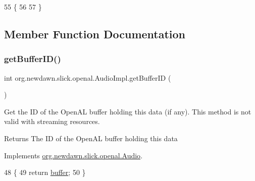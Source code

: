 \begin{DoxyCode}
55                           \{
56         
57     \}
\end{DoxyCode}


\subsection{Member Function Documentation}
\mbox{\label{classorg_1_1newdawn_1_1slick_1_1openal_1_1_audio_impl_aaf5df57bc6269d59c5220fc89ef3800f}} 
\subsubsection{\texorpdfstring{get\+Buffer\+I\+D()}{getBufferID()}}
{\footnotesize\ttfamily int org.\+newdawn.\+slick.\+openal.\+Audio\+Impl.\+get\+Buffer\+ID (\begin{DoxyParamCaption}{ }\end{DoxyParamCaption})\hspace{0.3cm}{\ttfamily [inline]}}

Get the ID of the Open\+AL buffer holding this data (if any). This method is not valid with streaming resources.

\begin{DoxyReturn}{Returns}
The ID of the Open\+AL buffer holding this data 
\end{DoxyReturn}


Implements \mbox{\hyperlink{interfaceorg_1_1newdawn_1_1slick_1_1openal_1_1_audio_ac2a651989c7933bd896c7e0c382ba655}{org.\+newdawn.\+slick.\+openal.\+Audio}}.


\begin{DoxyCode}
48                              \{
49         \textcolor{keywordflow}{return} \mbox{\hyperlink{classorg_1_1newdawn_1_1slick_1_1openal_1_1_audio_impl_ac08b49601da30895fecfdca4e8ba0049}{buffer}};
50     \}
\end{DoxyCode}
\mbox{\label{classorg_1_1newdawn_1_1slick_1_1openal_1_1_audio_impl_a71aa3ed24fc3e7e4e8603b89250b35bd}} 

